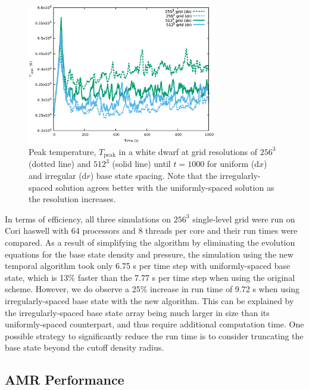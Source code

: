 \begin{figure}[hbt]
\begin{center}
\includegraphics[width=3.25in]{./figs/wdconvect_compare_Tmax}
\caption{\label{fig:wdconvect_Tmax} Peak temperature, $T_{\text{peak}}$  in a white dwarf at grid resolutions of
         $256^3$ (dotted line) and $512^3$ (solid line) until $t=1000$ for uniform (d$x$) and irregular (d$r$) base state spacing.
         Note that the irregularly-spaced solution agrees better
         with the uniformly-spaced solution as the resolution increases.}
\end{center}
\end{figure}

In terms of efficiency, all three simulations on $256^3$ single-level grid were run on Cori haswell with 64 processors and 8 threads per core and their run times were compared. As a result of simplifying the algorithm by eliminating the evolution equations for the base state density and pressure, the simulation using the new temporal algorithm took only 6.75 s per time step with uniformly-spaced base state, which is 13\% faster than the 7.77 s per time step when using the original scheme. However, we do observe a 25\% increase in run time of 9.72 s when using irregularly-spaced base state with the new algorithm. This can be explained by the irregularly-spaced base state array being much larger in size than its uniformly-spaced counterpart, and thus require additional computation time. One possible strategy to significantly reduce the run time is to consider truncating the base state beyond the cutoff density radius.


\subsection{AMR Performance}

